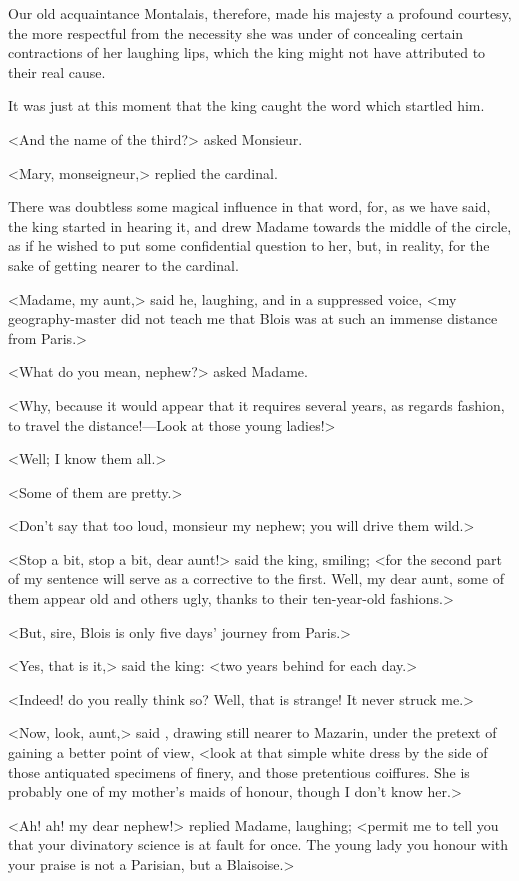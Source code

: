 Our old acquaintance Montalais, therefore, made his majesty a profound courtesy, the more respectful from the necessity she was under of concealing certain contractions of her laughing lips, which the king might not have attributed to their real cause.

It was just at this moment that the king caught the word which startled him.

<And the name of the third?> asked Monsieur.

<Mary, monseigneur,> replied the cardinal.

There was doubtless some magical influence in that word, for, as we have said, the king started in hearing it, and drew Madame towards the middle of the circle, as if he wished to put some confidential question to her, but, in reality, for the sake of getting nearer to the cardinal.

<Madame, my aunt,> said he, laughing, and in a suppressed voice, <my geography-master did not teach me that Blois was at such an immense distance from Paris.>

<What do you mean, nephew?> asked Madame.

<Why, because it would appear that it requires several years, as regards fashion, to travel the distance!—Look at those young ladies!>

<Well; I know them all.>

<Some of them are pretty.>

<Don't say that too loud, monsieur my nephew; you will drive them wild.>

<Stop a bit, stop a bit, dear aunt!> said the king, smiling; <for the second part of my sentence will serve as a corrective to the first. Well, my dear aunt, some of them appear old and others ugly, thanks to their ten-year-old fashions.>

<But, sire, Blois is only five days' journey from Paris.>

<Yes, that is it,> said the king: <two years behind for each day.>

<Indeed! do you really think so? Well, that is strange! It never struck me.>

<Now, look, aunt,> said , drawing still nearer to Mazarin, under the pretext of gaining a better point of view, <look at that simple white dress by the side of those antiquated specimens of finery, and those pretentious coiffures. She is probably one of my mother's maids of honour, though I don't know her.>

<Ah! ah! my dear nephew!> replied Madame, laughing; <permit me to tell you that your divinatory science is at fault for once. The young lady you honour with your praise is not a Parisian, but a Blaisoise.>

